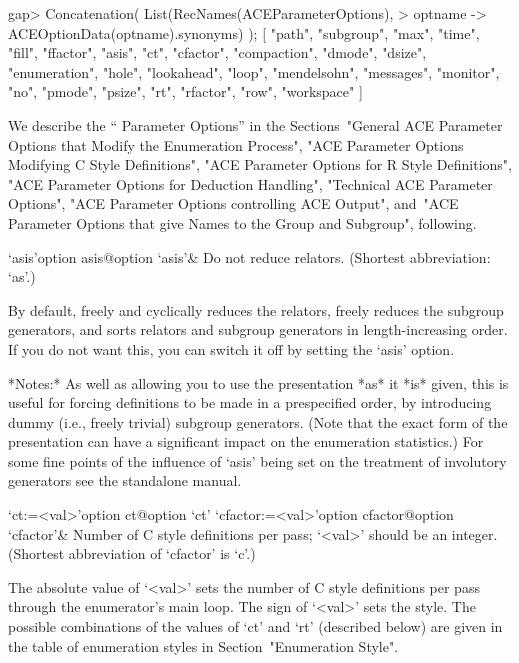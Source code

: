 \beginexample
gap> Concatenation( List(RecNames(ACEParameterOptions),
>                        optname -> ACEOptionData(optname).synonyms) );
[ "path", "subgroup", "max", "time", "fill", "ffactor", "asis", "ct", 
  "cfactor", "compaction", "dmode", "dsize", "enumeration", "hole", 
  "lookahead", "loop", "mendelsohn", "messages", "monitor", "no", "pmode", 
  "psize", "rt", "rfactor", "row", "workspace" ]

\endexample

We describe the ``{\ACE} Parameter Options'' in the  Sections~"General
ACE Parameter Options  that  Modify  the  Enumeration  Process",  "ACE
Parameter Options  Modifying  C  Style  Definitions",  "ACE  Parameter
Options for R Style Definitions", "ACE Parameter Options for Deduction
Handling", "Technical ACE Parameter Options", "ACE  Parameter  Options
controlling ACE Output", and~"ACE Parameter Options that give Names to
the Group and Subgroup", following.


\beginitems

\>`asis'{option asis}@{option `asis'}&
Do not reduce relators. (Shortest abbreviation: `as'.)

By default, {\ACE} freely  and cyclically reduces the relators, freely
reduces  the  subgroup generators,  and  sorts  relators and  subgroup
generators in length-increasing  order.  If you do not  want this, you
can switch it off by setting the `asis' option.

*Notes:* As well as allowing you  to use the presentation *as* it *is*
given,  this  is  useful for  forcing  definitions  to  be made  in  a
prespecified  order,  by  introducing  dummy  (i.e.,  freely  trivial)
subgroup generators.   (Note that the  exact form of  the presentation
can  have a significant  impact on  the enumeration  statistics.)  For
some fine points of the influence of `asis' being set on the treatment
of involutory generators see the {\ACE} standalone manual.

\>`ct:=<val>'{option ct}@{option `ct'}
\>`cfactor:=<val>'{option cfactor}@{option `cfactor'}&
Number of C style definitions per pass; `<val>' should be an  integer. 
(Shortest abbreviation of `cfactor' is `c'.)

The absolute value of `<val>' sets the number of C  style  definitions
per pass through the enumerator's main loop. The sign of `<val>'  sets
the style. The possible combinations of the values of  `ct'  and  `rt'
(described below) are given in the  table  of  enumeration  styles  in
Section~"Enumeration Style".

